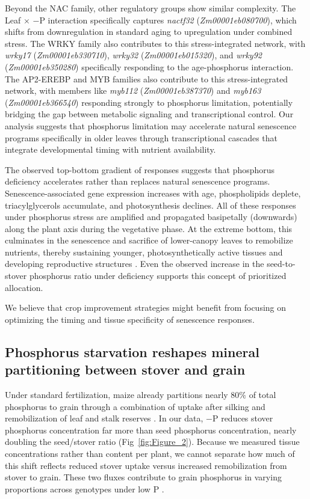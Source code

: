 \documentclass[9pt,twocolumn,twoside]{rilabRxiv}
\begin{document}
Beyond the NAC family, other regulatory groups show similar complexity. 
The Leaf $\times$ $-$P interaction specifically captures \textit{nactf32} (\textit{Zm00001eb080700}), which shifts from downregulation in standard aging to upregulation under combined stress. 
The WRKY family also contributes to this stress-integrated network, with \textit{wrky17} (\textit{Zm00001eb330710}), \textit{wrky32} (\textit{Zm00001eb015320}), and \textit{wrky92} (\textit{Zm00001eb350280}) specifically responding to the age-phosphorus interaction. 
The AP2-EREBP and MYB families also contribute to this stress-integrated network, with members like \textit{myb112} (\textit{Zm00001eb387370}) and \textit{myb163} (\textit{Zm00001eb366540}) responding strongly to phosphorus limitation, potentially bridging the gap between metabolic signaling and transcriptional control.
Our analysis suggests that phosphorus limitation may accelerate natural senescence programs specifically in older leaves through transcriptional cascades that integrate developmental timing with nutrient availability.

The observed top-bottom gradient of responses suggests that phosphorus deficiency accelerates rather than replaces natural senescence programs. 
Senescence-associated gene expression increases with age, phospholipids deplete, triacylglycerols accumulate, and photosynthesis declines.
All of these responses under phosphorus stress are amplified and propagated basipetally (downwards) along the plant axis during the vegetative phase. 
At the extreme bottom, this culminates in the senescence and sacrifice of lower-canopy leaves to remobilize nutrients, thereby sustaining younger, photosynthetically active tissues and developing reproductive structures \cite{wei2025}.
Even the observed increase in the seed-to-stover phosphorus ratio under deficiency supports this concept of prioritized allocation. 

We believe that crop improvement strategies might benefit from focusing on optimizing the timing and tissue specificity of senescence responses.

\subsection*{Phosphorus starvation reshapes mineral partitioning between stover and grain}

Under standard fertilization, maize already partitions nearly $80\%$ of total phosphorus to grain through a combination of uptake after silking and remobilization of leaf and stalk reserves \citep{bender2013,veneklaas2012}.
In our data, $-$P reduces stover phosphorus concentration far more than seed phosphorus concentration, nearly doubling the seed/stover ratio (Fig~\ref{fig:Figure_2}).
Because we measured tissue concentrations rather than content per plant, we cannot separate how much of this shift reflects reduced stover uptake versus increased remobilization from stover to grain. These two fluxes contribute to grain phosphorus in varying proportions across genotypes under low P \citep{sun2023,roller2025}.
\end{document}
